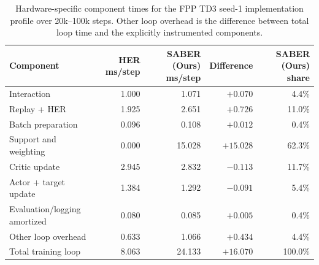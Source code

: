 \begin{table}[t]
\centering
\small
\setlength{\tabcolsep}{7pt}
\begin{tabular}{lrrrr}
\toprule
Component & HER ms/step & SABER (Ours) ms/step & Difference & SABER (Ours) share \\
\midrule
Interaction & 1.000 & 1.071 & \(+0.070\) & 4.4\% \\
Replay + HER & 1.925 & 2.651 & \(+0.726\) & 11.0\% \\
Batch preparation & 0.096 & 0.108 & \(+0.012\) & 0.4\% \\
Support and weighting & 0.000 & 15.028 & \(+15.028\) & 62.3\% \\
Critic update & 2.945 & 2.832 & \(-0.113\) & 11.7\% \\
Actor + target update & 1.384 & 1.292 & \(-0.091\) & 5.4\% \\
Evaluation/logging amortized & 0.080 & 0.085 & \(+0.005\) & 0.4\% \\
Other loop overhead & 0.633 & 1.066 & \(+0.434\) & 4.4\% \\
\midrule
Total training loop & 8.063 & 24.133 & \(+16.070\) & 100.0\% \\
\bottomrule
\end{tabular}
\caption{Hardware-specific component times for the FPP TD3 seed-1
implementation profile over 20k--100k steps. Other loop overhead is the
difference between total loop time and the explicitly instrumented components.}
\label{tab:supp-runtime-components}
\end{table}
